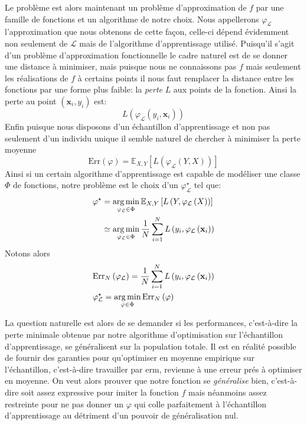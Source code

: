 Le problème est alors maintenant un problème d'approximation de $f$ par une famille de fonctions et un algorithme de notre choix. Nous appellerons $\varphi_{\mathcal{L}}$ l'approximation que nous obtenons de cette façon, celle-ci dépend évidemment non seulement de $\mathcal{L}$ mais de l'algorithme d'apprentissage utilisé. Puisqu'il s'agit d'un problème d'approximation fonctionnelle le cadre naturel est de se donner une distance à minimiser, mais puisque nous ne connaissons pas $f$ mais seulement les réalisations de $f$ à certains points il nous faut remplacer la distance entre les fonctions par une forme plus faible: la \emph{perte} $L$ aux points de la fonction. Ainsi la perte au point $(\mathbf{x}_i,y_i)$ est:
\begin{equation*}
    L(\varphi_{\mathcal{L}} (y_i,\mathbf{x}_i))
\end{equation*}
Enfin puisque nous disposons d'un échantillon d'apprentissage et non pas seulement d'un individu unique il semble naturel de chercher à minimiser la perte moyenne
\begin{equation*}
    \mathrm{Err} \left( \varphi  \right) = \mathbb{E}_{X,Y} \left[ L(\varphi_{\mathcal{L}} (Y,X)) \right]
\end{equation*}
Ainsi si un certain algorithme d'apprentissage est capable de modéliser une classe $\Phi$ de fonctions, notre problème est le choix d'un $\varphi_{\mathcal{L}}^\star$ tel que:
\begin{align*}
    \varphi^\star &= \operatorname*{arg\,min}_{\varphi_{\mathcal{L}} \in \Phi} \mathbb{E}_{X,Y} \left[ L\left(Y,\varphi_{\mathcal{L}}\left(X\right)\right) \right] \\
    &\simeq \operatorname*{arg\,min}_{\varphi_{\mathcal{L}} \in \Phi} \frac{1}{N} \sum_{i=1}^N L\left(y_i,\varphi_{\mathcal{L}}\left(\mathbf{x}_i\right)\right)
\end{align*}
Notons alors
\begin{align*}
    &\mathrm{Err}_N \left( \varphi_{\mathcal{L}} \right) = \frac{1}{N} \sum_{i=1}^N L\left(y_i,\varphi_{\mathcal{L}}\left(\mathbf{x}_i\right)\right) \\
    &\varphi_{\mathcal{L}}^\star = \operatorname*{arg\,min}_{\varphi \in \Phi} \mathrm{Err}_N \left( \varphi  \right)
\end{align*}

La question naturelle est alors de se demander si les performances, c'est-à-dire la perte minimale obtenue par notre algorithme d'optimisation sur l'échantillon d'apprentissage, se généralisent sur la population totale. Il est en réalité possible de fournir des garanties pour qu'optimiser en moyenne empirique sur l'échantillon, c'est-à-dire travailler par \ac{erm}, revienne à une erreur prés à optimiser en moyenne. On veut alors prouver que notre fonction se \emph{généralise} bien, c'est-à-dire soit assez expressive pour imiter la fonction $f$ mais néanmoins assez restreinte pour ne pas donner un $\varphi$ qui colle parfaitement à l'échantillon d'apprentissage au détriment d'un pouvoir de généralisation nul.

